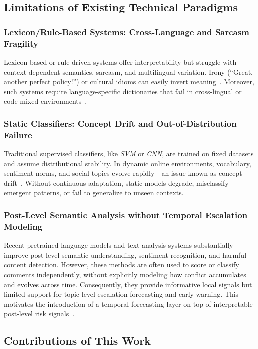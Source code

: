 \documentclass[journal]{IEEEtran}
\begin{document}
\subsection{Limitations of Existing Technical Paradigms}

\subsubsection{Lexicon/Rule-Based Systems: Cross-Language and Sarcasm Fragility}
Lexicon-based or rule-driven systems offer interpretability but struggle with context-dependent semantics, sarcasm, and multilingual variation. Irony (“Great, another perfect policy!”) or cultural idioms can easily invert meaning~\cite{Dhumpati2025}. Moreover, such systems require language-specific dictionaries that fail in cross-lingual or code-mixed environments~\cite{Kaity2020}.

\subsubsection{Static Classifiers: Concept Drift and Out-of-Distribution Failure}
Traditional supervised classifiers, like \emph{SVM} or \emph{CNN}, are trained on fixed datasets and assume distributional stability. In dynamic online environments, vocabulary, sentiment norms, and social topics evolve rapidly—an issue known as concept drift~\cite{Gama2014}. Without continuous adaptation, static models degrade, misclassify emergent patterns, or fail to generalize to unseen contexts.

\subsubsection{Post-Level Semantic Analysis without Temporal Escalation Modeling}
Recent pretrained language models and text analysis systems substantially improve post-level semantic understanding, sentiment recognition, and harmful-content detection. However, these methods are often used to score or classify comments independently, without explicitly modeling how conflict accumulates and evolves across time. Consequently, they provide informative local signals but limited support for topic-level escalation forecasting and early warning. This motivates the introduction of a temporal forecasting layer on top of interpretable post-level risk signals~\cite{Abdalgader2025}.

\subsection{Contributions of This Work}
\end{document}
